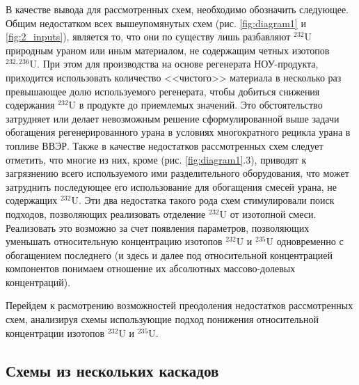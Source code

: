 В качестве вывода для рассмотренных схем, необходимо обозначить следующее. Общим недостатком всех вышеупомянутых схем (рис. \ref{fig:diagram1} и \ref{fig:2_inputs}), является то, что они по существу лишь разбавляют $^{232}$U природным ураном или иным материалом, не содержащим четных изотопов $^{232,236}$U. При этом для производства на основе регенерата НОУ-продукта, приходится использовать количество <<чистого>> материала в несколько раз превышающее долю используемого регенерата, чтобы добиться снижения содержания $^{232}$U в продукте до приемлемых значений. Это обстоятельство затрудняет или делает невозможным решение сформулированной выше задачи обогащения регенерированного урана в условиях многократного рецикла урана в топливе ВВЭР. Также в качестве недостатков рассмотренных схем следует отметить, что многие из них, кроме (рис. \ref{fig:diagram1}.3), приводят к загрязнению всего используемого ими разделительного оборудования, что может затруднить последующее его использование для обогащения смесей урана, не содержащих $^{232}$U. Эти два недостатка такого рода схем стимулировали поиск подходов, позволяющих реализовать отделение $^{232}$U от изотопной смеси. Реализовать это возможно за счет появления параметров, позволяющих уменьшать относительную концентрацию изотопов $^{232}$U и $^{235}$U одновременно с обогащением последнего (и здесь и далее под относительной концентрацией компонентов понимаем отношение их абсолютных массово-долевых концентраций).

Перейдем к расмотрению возможностей преодоления недостатков рассмотренных схем, анализируя схемы использующие подход понижения относительной концентрации изотопов  $^{232}$U и $^{235}$U.

\subsection{Схемы из нескольких каскадов}

